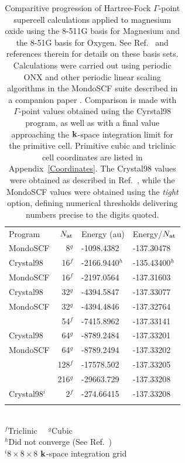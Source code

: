 \documentclass[prb,aps,nobibnotes,twocolumn,doublespace,twocolumngrid,superbib]{revtex4}
\begin{document}
%
%
%
\suppressfloats
\begin{table}
\caption{Comparitive progression of Hartree-Fock $\Gamma$-point supercell calculations 
applied to magnesium oxide using the 8-511G basis for Magnesium and the 8-51G basis for 
Oxygen. See Ref.~\cite{MTowlerLib} and references therein for details on these basis sets. 
Calculations were carried out using periodic {\sc ONX} and other periodic linear scaling
algorithms in the {\sc MondoSCF} suite described in a companion paper \cite{CTymczak04a}. 
Comparison is made with $\Gamma$-point values obtained using the {\sc Cyrstal98} program, 
as well as with a final value approaching the $\bf k$-space integration limit for the 
primitive cell.  Primitive cubic and triclinic cell coordinates are listed in 
Appendix~\ref{Coordinates}.  The {\sc Crystal98} values were obtained as 
described in Ref.~\cite{BCivalleri02}, while the {\sc MondoSCF} values were obtained using 
the {\it tight} option, defining numerical thresholds delivering numbers precise to the 
digits quoted.} 
\label{MgOTable}
\begin{tabular}{lrll}
\toprule
Program         & $N_{\rm at}$              & Energy (au)    & Energy/$N_{\rm at}$\\ 
\colrule
{\sc MondoSCF}       & 8$^g$    & -1098.4382     & -137.30478  \\
{\sc Crystal98}      & 16$^f$   & -2166.9440$^h$ & -135.43400$^h$ \\
{\sc MondoSCF}       & 16$^f$   & -2197.0564     & -137.31603  \\
{\sc Crystal98}      & 32$^g$   & -4394.5847     & -137.33077  \\
{\sc MondoSCF}       & 32$^g$   & -4394.4846     & -137.32764  \\
                     & 54$^f$   & -7415.8962     & -137.33141  \\
{\sc Crystal98}      & 64$^g$   & -8789.2484     & -137.33201  \\
{\sc MondoSCF}       & 64$^g$   & -8789.2494     & -137.33202  \\
                     & 128$^f$  & -17578.502     & -137.33205  \\
                     & 216$^g$  & -29663.729     & -137.33208  \\ 
\hline
{\sc Crystal98}$^i$  & 2$^f$    & -274.66415     & -137.33208  \\ 
\botrule 
\end{tabular}\\
$^f$Triclinic~~
$^g$Cubic \\
$^h$Did not converge (See Ref.~\cite{BCivalleri02}) \\
$^i 8\times8\times8$ $\bf k$-space integration grid  \\
\end{table}
\end{document}

